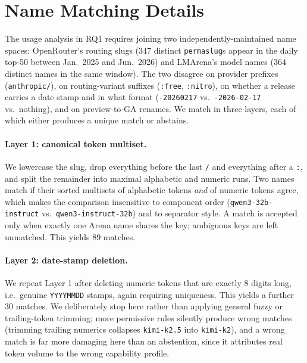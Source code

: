 \section{Name Matching Details}
\label{app:matching_details}

The usage analysis in RQ1 requires joining two independently-maintained name
spaces: OpenRouter's routing slugs (347 distinct \texttt{permaslug}s appear in
the daily top-50 between Jan.\ 2025 and Jun.\ 2026) and LMArena's model names
(364 distinct names in the same window). The two disagree on provider prefixes
(\texttt{anthropic/}), on routing-variant suffixes (\texttt{:free},
\texttt{:nitro}), on whether a release carries a date stamp and in what format
(\texttt{-20260217} vs.\ \texttt{-2026-02-17} vs.\ nothing), and on
preview-to-GA renames. We match in three layers, each of which either produces a
unique match or abstains.

\paragraph{Layer 1: canonical token multiset.} We lowercase the slug, drop
everything before the last \texttt{/} and everything after a \texttt{:}, and
split the remainder into maximal alphabetic and numeric runs. Two names match if
their sorted multisets of alphabetic tokens \emph{and} of numeric tokens agree,
which makes the comparison insensitive to component order
(\texttt{qwen3-32b-instruct} vs.\ \texttt{qwen3-instruct-32b}) and to separator
style. A match is accepted only when exactly one Arena name shares the key;
ambiguous keys are left unmatched. This yields 89 matches.

\paragraph{Layer 2: date-stamp deletion.} We repeat Layer 1 after deleting
numeric tokens that are exactly 8 digits long, i.e.\ genuine
\texttt{YYYYMMDD} stamps, again requiring uniqueness. This yields a further 30
matches. We deliberately stop here rather than applying general fuzzy or
trailing-token trimming: more permissive rules silently produce wrong matches
(trimming trailing numerics collapses \texttt{kimi-k2.5} into \texttt{kimi-k2}),
and a wrong match is far more damaging here than an abstention, since it
attributes real token volume to the wrong capability profile.

